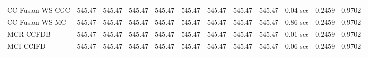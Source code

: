 \begin{table}[H]
\begin{tabular}{lrrrrrrrrrrr}
    CC-Fusion-WS-CGC & $       545.47$ & $       545.47$ & $       545.47$ & $       545.47$ & $       545.47$ & $       545.47$ & $       545.47$ & $       545.47$ & $         0.04$ sec    & $       0.2459$  & $       0.9702$ \\ 
     CC-Fusion-WS-MC & $       545.47$ & $       545.47$ & $       545.47$ & $       545.47$ & $       545.47$ & $       545.47$ & $       545.47$ & $       545.47$ & $         0.86$ sec    & $       0.2459$  & $       0.9702$ \\ 
\cmidrule{1-1} 
           MCR-CCFDB & $       545.47$ & $       545.47$ & $       545.47$ & $       545.47$ & $       545.47$ & $       545.47$ & $       545.47$ & $       545.47$ & $         0.01$ sec    & $       0.2459$  & $       0.9702$ \\ 
\cmidrule{1-1} 
           MCI-CCIFD & $       545.47$ & $       545.47$ & $       545.47$ & $       545.47$ & $       545.47$ & $       545.47$ & $       545.47$ & $       545.47$ & $         0.06$ sec    & $       0.2459$  & $       0.9702$ \\ 
\bottomrule
\end{tabular}
\end{table}


